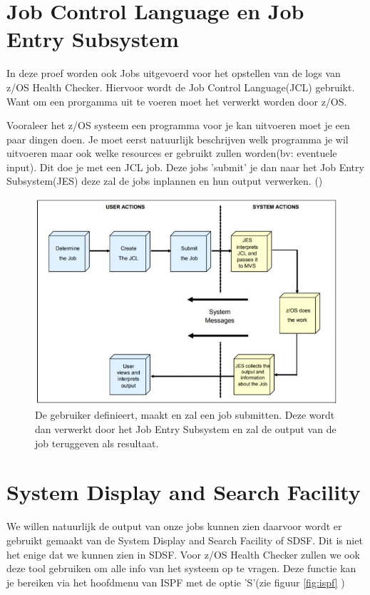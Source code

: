 \section{Job Control Language en Job Entry Subsystem}
\label{sec:Job Control Language en Job Entry Subsystem}

In deze proef worden ook Jobs uitgevoerd voor het opstellen van de logs van z/OS Health Checker. Hiervoor wordt de Job Control Language(JCL) gebruikt. Want om een prorgamma uit te voeren moet het verwerkt worden door z/OS.

Vooraleer het z/OS systeem een programma voor je kan uitvoeren moet je een paar dingen doen. Je moet eerst natuurlijk beschrijven welk programma je wil uitvoeren maar ook welke resources er gebruikt zullen worden(bv: eventuele input). Dit doe je met een JCL job. Deze jobs 'submit' je dan naar het Job Entry Subsystem(JES) deze zal de jobs inplannen en hun output verwerken. (\cite{Cosimo2018})

\begin{figure}[h]
	\centering
	\includegraphics{img/JES}
	\caption[Visualisatie van JCL en JES]{De gebruiker definieert, maakt en zal een job submitten. Deze wordt dan verwerkt door het Job Entry Subsystem en zal de output van de job teruggeven als resultaat.}
	\label{fig:jes}
\end{figure}

\section{System Display and Search Facility}
\label{sec:System Display and Search Facility}

We willen natuurlijk de output van onze jobs kunnen zien daarvoor wordt er gebruikt gemaakt van de System Display and Search Facility of SDSF. Dit is niet het enige dat we kunnen zien in SDSF. Voor z/OS Health Checker zullen we ook deze tool gebruiken om alle info van het systeem op te vragen. Deze functie kan je bereiken via het hoofdmenu van ISPF met de optie 'S'(zie figuur \ref{fig:ispf} )

